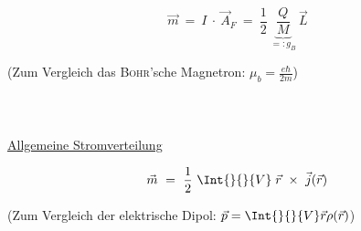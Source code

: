 \begin{equation*}
\vec{m}  \ =\ I \ \cdot \ \vec{A}_F \ = \ \frac{1}{2} \ \underbrace{\frac{Q}{M}}_{=: g_B} \ \vec{L}
\end{equation*}

(Zum Vergleich das \textsc{Bohr}'sche Magnetron: $\mu_b = \frac{e\hbar}{2m}$)
\ \\
\ \\
\ \\
\ \\
\underline{Allgemeine Stromverteilung}

\begin{equation*}
\vec{m} \ = \ \frac{1}{2} \ \Int{}{}{V} \; \vec{r}\ \times \ \vec{j}(\vec{r})
\end{equation*}

(Zum Vergleich der elektrische Dipol: $\vec{p} = \Int{}{}{V} \vec{r}\rho(\vec{r})$)